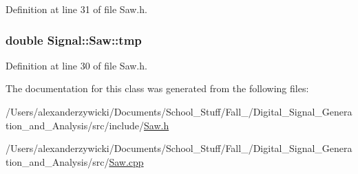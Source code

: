 Definition at line 31 of file Saw.\+h.

\hypertarget{class_signal_1_1_saw_ad22f84065bf0bb32f437bc76709277f5}{
\subsubsection[{tmp}]{\setlength{\rightskip}{0pt plus 5cm}double Signal\+::\+Saw\+::tmp\hspace{0.3cm}{\ttfamily [protected]}}}\label{class_signal_1_1_saw_ad22f84065bf0bb32f437bc76709277f5}


Definition at line 30 of file Saw.\+h.



The documentation for this class was generated from the following files\+:\begin{DoxyCompactItemize}
\item 
/\+Users/alexanderzywicki/\+Documents/\+School\+\_\+\+Stuff/\+Fall\+\_/\+Digital\+\_\+\+Signal\+\_\+\+Generation\+\_\+and\+\_\+\+Analysis/src/include/\hyperlink{_saw_8h}{Saw.\+h}\item 
/\+Users/alexanderzywicki/\+Documents/\+School\+\_\+\+Stuff/\+Fall\+\_/\+Digital\+\_\+\+Signal\+\_\+\+Generation\+\_\+and\+\_\+\+Analysis/src/\hyperlink{_saw_8cpp}{Saw.\+cpp}\end{DoxyCompactItemize}
